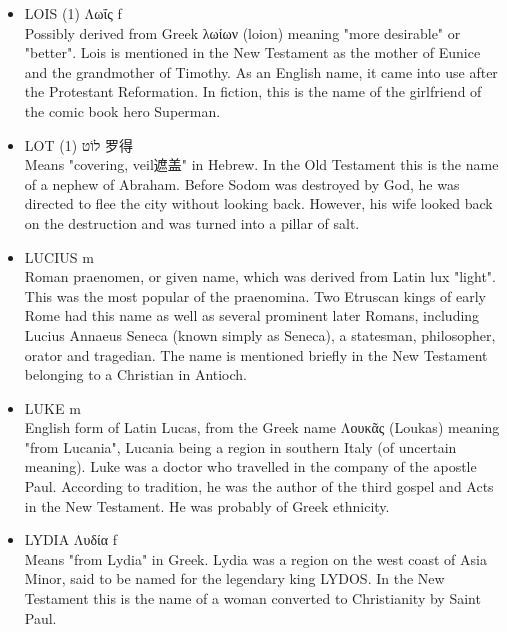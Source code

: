 \begin{itemize}
\item LOIS (1) Λωΐς f \\
Possibly derived from Greek λωίων (loion) meaning "more desirable" or "better". Lois is mentioned in the New Testament as the mother of Eunice and the grandmother of Timothy. As an English name, it came into use after the Protestant Reformation. In fiction, this is the name of the girlfriend of the comic book hero Superman.
\item LOT (1) לוֹט 罗得 \\
Means "covering, veil遮盖" in Hebrew. In the Old Testament this is the name of a nephew of Abraham. Before Sodom was destroyed by God, he was directed to flee the city without looking back. However, his wife looked back on the destruction and was turned into a pillar of salt.
\item LUCIUS m \\
Roman praenomen, or given name, which was derived from Latin lux "light". This was the most popular of the praenomina. Two Etruscan kings of early Rome had this name as well as several prominent later Romans, including Lucius Annaeus Seneca (known simply as Seneca), a statesman, philosopher, orator and tragedian. The name is mentioned briefly in the New Testament belonging to a Christian in Antioch. 

\item LUKE m \\
English form of Latin Lucas, from the Greek name Λουκᾶς (Loukas) meaning "from Lucania", Lucania being a region in southern Italy (of uncertain meaning). Luke was a doctor who travelled in the company of the apostle Paul. According to tradition, he was the author of the third gospel and Acts in the New Testament. He was probably of Greek ethnicity. 

\item LYDIA Λυδία f \\
Means "from Lydia" in Greek. Lydia was a region on the west coast of Asia Minor, said to be named for the legendary king LYDOS. In the New Testament this is the name of a woman converted to Christianity by Saint Paul.
\end{itemize}

